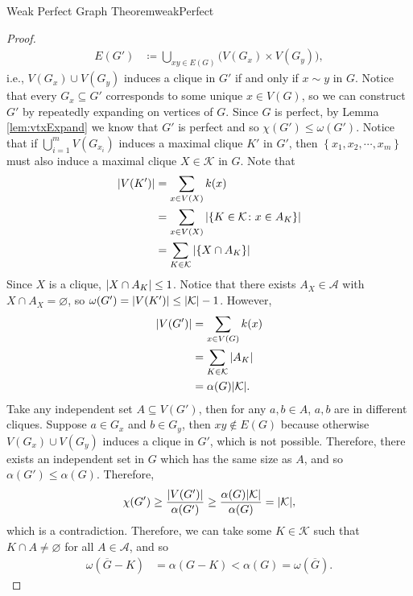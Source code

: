 \documentclass[math, code]{amznotes}
\theoremstyle{remark}
\begin{document}
\begin{thmbox}{Weak Perfect Graph Theorem}{weakPerfect}
\begin{proof}
\begin{align*}
            E(G') & \coloneqq \bigcup_{xy \in E(G)}\bigl(V(G_x) \times V(G_y)\bigr),
        \end{align*}
        i.e., $V(G_x) \cup V(G_y)$ induces a clique in $G'$ if and only if $x \sim y$ in $G$. Notice that every $G_x \subseteq G'$ corresponds to some unique $x \in V(G)$, so we can construct $G'$ by repeatedly expanding on vertices of $G$. Since $G$ is perfect, by Lemma \ref{lem:vtxExpand} we know that $G'$ is perfect and so $\chi(G') \leq \omega(G')$. Notice that if $\bigcup_{i = 1}^{m}V\left(G_{x_i}\right)$ induces a maximal clique $K'$ in $G'$, then $\left\{x_1, x_2, \cdots, x_m\right\}$ must also induce a maximal clique $X \in \mathcal{K}$ in $G$. Note that 
        \begin{align*}
            {\left\lvert {V(K')} \right\rvert} & = \sum_{x \in V(X)}k(x) \\
            & = \sum_{x \in V(X)}{\left\lvert {\left\{K \in \mathcal{K}\colon x \in A_K\right\}} \right\rvert} \\
            & = \sum_{K \in \mathcal{K}}{\left\lvert {\left\{X \cap A_K\right\}} \right\rvert}
        \end{align*}
        Since $X$ is a clique, ${\left\lvert {X \cap A_K} \right\rvert} \leq 1$. Notice that there exists $A_X \in \mathcal{A}$ with $X \cap A_X = \varnothing$, so $\omega(G') = {\left\lvert {V(K')} \right\rvert} \leq {\left\lvert {\mathcal{K}} \right\rvert} - 1$. However,
        \begin{align*}
            {\left\lvert {V(G')} \right\rvert} & = \sum_{x \in V(G)}k(x) \\
            & = \sum_{K \in \mathcal{K}}{\left\lvert {A_K} \right\rvert} \\
            & = \alpha(G){\left\lvert {\mathcal{K}} \right\rvert}.
        \end{align*}
        Take any independent set $A \subseteq V(G')$, then for any $a, b \in A$, $a, b$ are in different cliques. Suppose $a \in G_x$ and $b \in G_y$, then $xy \notin E(G)$ because otherwise $V(G_x) \cup V(G_y)$ induces a clique in $G'$, which is not possible. Therefore, there exists an independent set in $G$ which has the same size as $A$, and so $\alpha(G') \leq \alpha(G)$. Therefore,
        \begin{equation*}
            \chi(G') \geq \frac{{\left\lvert {V(G')} \right\rvert}}{\alpha(G')} \geq \frac{\alpha(G){\left\lvert {\mathcal{K}} \right\rvert}}{\alpha(G)} = {\left\lvert {\mathcal{K}} \right\rvert},
        \end{equation*}
        which is a contradiction. Therefore, we can take some $K \in \mathcal{K}$ such that $K \cap A \neq \varnothing$ for all $A \in \mathcal{A}$, and so 
        \begin{align*}
            \omega\left(\overline{G} - K\right) & = \alpha(G - K) < \alpha(G) = \omega\left(\overline{G}\right). 

\end{align*}
\end{proof}
\end{thmbox}
\end{document}

